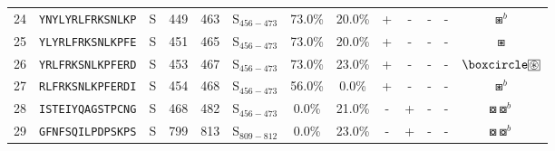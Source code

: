 \begin{tabular}{rcccccccccccc}
24 &  \texttt{YNYLYRLFRKSNLKP} &       S &    449 &   463 &  S$_{456-473}$ &                          73.0\% &                           20.0\% &          + &           - &          - &           - &                                                                          $ \boxast^b $ \\
25 &  \texttt{YLYRLFRKSNLKPFE} &       S &    451 &   465 &  S$_{456-473}$ &                          73.0\% &                           20.0\% &          + &           - &          - &           - &                                                                            $ \boxast $ \\
26 &  \texttt{YRLFRKSNLKPFERD} &       S &    453 &   467 &  S$_{456-473}$ &                          73.0\% &                           23.0\% &          + &           - &          - &           - &                         $ \boxcircle \setlength{\fboxsep}{0.5pt} \boxed{\circledast} $ \\
27 &  \texttt{RLFRKSNLKPFERDI} &       S &    454 &   468 &  S$_{456-473}$ &                          56.0\% &                            0.0\% &          + &           - &          - &           - &                                                                          $ \boxast^b $ \\
28 &  \texttt{ISTEIYQAGSTPCNG} &       S &    468 &   482 &  S$_{456-473}$ &                           0.0\% &                           21.0\% &          - &           + &          - &           - &                                                            $ \boxcircle \boxcircle^b $ \\
29 &  \texttt{GFNFSQILPDPSKPS} &       S &    799 &   813 &  S$_{809-812}$ &                           0.0\% &                           23.0\% &          - &           + &          - &           - &                                                            $ \boxcircle \boxcircle^b $ \\
\bottomrule
\end{tabular}
